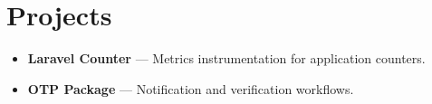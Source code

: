 \section*{Projects}
\begin{itemize}
  \item \textbf{Laravel Counter} --- Metrics instrumentation for application counters.
  \item \textbf{OTP Package} --- Notification and verification workflows.
\end{itemize}
